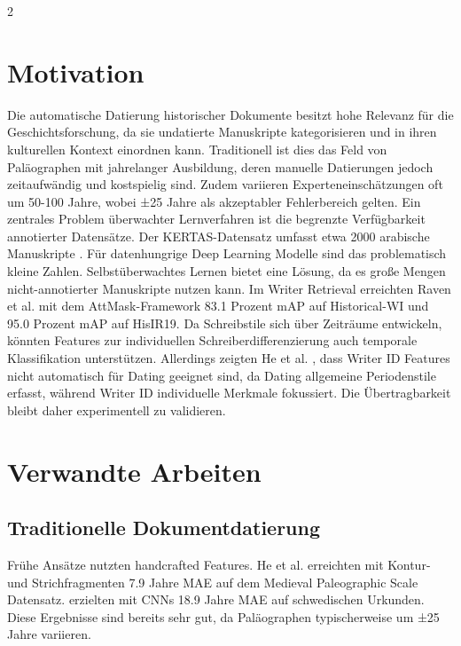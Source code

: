 \documentclass[12pt,a4paper]{article}
\begin{document}
\begin{multicols}{2}

\section{Motivation}

Die automatische Datierung historischer Dokumente besitzt hohe Relevanz für die Geschichtsforschung, da sie undatierte Manuskripte kategorisieren und in ihren kulturellen Kontext einordnen kann. Traditionell ist dies das Feld von Paläographen mit jahrelanger Ausbildung, deren manuelle Datierungen jedoch zeitaufwändig und kostspielig sind. Zudem variieren Experteneinschätzungen oft um 50-100 Jahre, wobei ±25 Jahre als akzeptabler Fehlerbereich gelten. Ein zentrales Problem überwachter Lernverfahren ist die begrenzte Verfügbarkeit annotierter Datensätze. Der KERTAS-Datensatz umfasst etwa 2000 arabische Manuskripte \cite{adam2018kertas}. Für datenhungrige Deep Learning Modelle sind das problematisch kleine Zahlen. Selbstüberwachtes Lernen bietet eine Lösung, da es große Mengen nicht-annotierter Manuskripte nutzen kann. Im Writer Retrieval erreichten Raven et al. \cite{raven2024self} mit dem AttMask-Framework 83.1 Prozent mAP auf Historical-WI und 95.0 Prozent mAP auf HisIR19. Da Schreibstile sich über Zeiträume entwickeln, könnten Features zur individuellen Schreiberdifferenzierung auch temporale Klassifikation unterstützen. Allerdings zeigten He et al. \cite{he2016image}, dass Writer ID Features nicht automatisch für Dating geeignet sind, da Dating allgemeine Periodenstile erfasst, während Writer ID individuelle Merkmale fokussiert. Die Übertragbarkeit bleibt daher experimentell zu validieren.

\section{Verwandte Arbeiten}

\subsection{Traditionelle Dokumentdatierung}

Frühe Ansätze nutzten handcrafted Features. He et al. \cite{he2016image} erreichten mit Kontur- und Strichfragmenten 7.9 Jahre MAE auf dem Medieval Paleographic Scale Datensatz. \cite{wahlberg2016historical} erzielten mit CNNs 18.9 Jahre MAE auf schwedischen Urkunden. Diese Ergebnisse sind bereits sehr gut, da Paläographen typischerweise um ±25 Jahre variieren.


\end{multicols}
\end{document}

